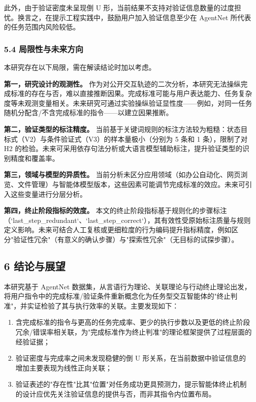 \documentclass[12pt,a4paper,openany,oneside]{ctexrep}
\begin{document}
此外，由于验证密度未呈现倒 U 形，当前结果不支持对验证信息数量的过度担忧。换言之，在提示工程实践中，鼓励用户加入验证信息至少在 AgentNet 所代表的任务范围内风险较低。

\subsubsection{5.4 局限性与未来方向}


本研究存在以下局限，需在解读结论时加以考虑。

\textbf{第一，研究设计的观测性。} 作为对公开交互轨迹的二次分析，本研究无法操纵完成标准的存在与否，难以直接推断因果。完成标准可能与用户表达能力、任务复杂度等未观测变量相关。未来研究可通过实验操纵验证显性度——例如，对同一任务随机分配含/不含完成标准的指令——以建立因果推断。

\textbf{第二，验证类型的标注精度。} 当前基于关键词规则的标注方法较为粗糙：状态目标式（V2）与条件验证式（V3）的样本量极小（分别为 5 条和 1 条），限制了对 H2 的检验。未来可采用依存句法分析或大语言模型辅助标注，提升验证类型的识别精度和覆盖率。

\textbf{第三，领域与模型的异质性。} 当前分析未区分应用领域（如办公自动化、网页浏览、文件管理）与智能体模型版本，这些因素可能调节完成标准的效应。未来可引入这些变量进行分层分析。

\textbf{第四，终止阶段指标的效度。} 本文的终止阶段指标基于规则化的步骤标注（`last\_step\_redundant`、`last\_step\_correct`），其有效性受原始标注质量与规则定义影响。未来可结合人工复核或更细粒度的行为编码提升指标精度，例如区分"验证性冗余"（有意义的确认步骤）与"探索性冗余"（无目标的试探步骤）。

\subsection{6 结论与展望}


本研究基于 AgentNet 数据集，从言语行为理论、关联理论与行动终止理论出发，将用户指令中的完成标准/验证条件重新概念化为任务型交互智能体的"终止判准"，并实证检验了其与执行效率的关联。主要发现如下：

\begin{enumerate}
\item[1.] 含完成标准的指令与更高的任务完成率、更少的执行步数以及更低的终止阶段冗余/错误率相关联，为"完成标准作为终止判准"的理论框架提供了过程层面的经验证据；
\item[2.] 验证密度与完成率之间未发现稳健的倒 U 形关系，在当前数据中验证信息的增加主要表现为线性正向关联；
\item[3.] 验证表述的"存在性"比其"位置"对任务成功更具预测力，提示智能体终止机制的设计应优先关注验证信息的提供与否，而非其指令内位置布局。
\end{enumerate}
\end{document}
